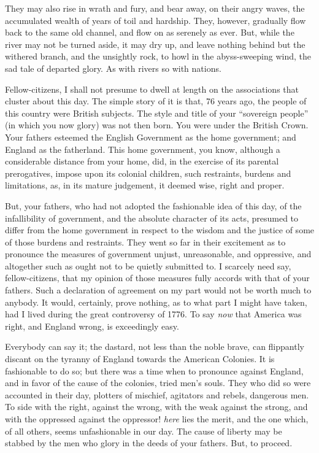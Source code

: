They may also rise in wrath and fury, and bear away, on their angry waves, the accumulated wealth of years of toil and hardship. They, however, gradually flow back to the same old channel, and flow on as serenely as ever. But, while the river may not be turned aside, it may dry up, and leave nothing behind but the withered branch, and the unsightly rock, to howl in the abyss-sweeping wind, the sad tale of departed glory. As with rivers so with nations.\par

Fellow-citizens, I shall not presume to dwell at length on the associations that cluster about this day. The simple story of it is that, 76 years ago, the people of this country were British subjects. The style and title of your “sovereign people” (in which you now glory) was not then born. You were under the British Crown. Your fathers esteemed the English Government as the home government; and England as the fatherland. This home government, you know, although a considerable distance from your home, did, in the exercise of its parental prerogatives, impose upon its colonial children, such restraints, burdens and limitations, as, in its mature judgement, it deemed wise, right and proper.\par

But, your fathers, who had not adopted the fashionable idea of this day, of the infallibility of government, and the absolute character of its acts, presumed to differ from the home government in respect to the wisdom and the justice of some of those burdens and restraints. They went so far in their excitement as to pronounce the measures of government unjust, unreasonable, and oppressive, and altogether such as ought not to be quietly submitted to. I scarcely need say, fellow-citizens, that my opinion of those measures fully accords with that of your fathers. Such a declaration of agreement on my part would not be worth much to anybody. It would, certainly, prove nothing, as to what part I might have taken, had I lived during the great controversy of 1776. To say \textit{now} that America was right, and England wrong, is exceedingly easy.\par

Everybody can say it; the dastard, not less than the noble brave, can flippantly discant on the tyranny of England towards the American Colonies. It is fashionable to do so; but there was a time when to pronounce against England, and in favor of the cause of the colonies, tried men’s souls. They who did so were accounted in their day, plotters of mischief, agitators and rebels, dangerous men. To side with the right, against the wrong, with the weak against the strong, and with the oppressed against the oppressor! \textit{here} lies the merit, and the one which, of all others, seems unfashionable in our day. The cause of liberty may be stabbed by the men who glory in the deeds of your fathers. But, to proceed.\par


